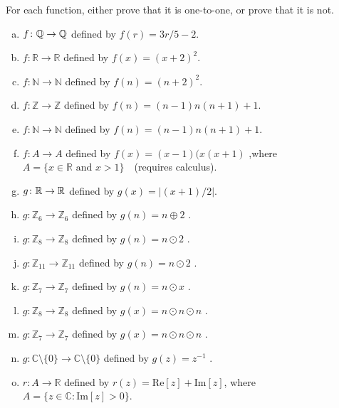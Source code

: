\begin{exercise}{40} 
For each function, either prove that it is one-to-one, or prove that it is not.
\begin{enumerate}[(a)]
\item \label{IsIt11?-linear}
 $f \colon \mathbb{Q} \to \mathbb{Q}$ defined by $f(r)=3r/5 - 2$.
\item \label{IsIt11?-square0}
 $f \colon {\mathbb R} \to {\mathbb R}$ defined by $f(x)=(x+2)^2$.
\item \label{IsIt11?-square}
 $f \colon {\mathbb N} \to {\mathbb N}$ defined by $f(n)=(n+2)^2$.
\item
 $f \colon {\mathbb Z} \to {\mathbb Z}$ defined by $f(n)=(n-1)n(n+1)+1$.
\item
 $f \colon {\mathbb N} \to {\mathbb N}$ defined by $f(n)=(n-1)n(n+1)+1$.
\item
 $f \colon A \to A$ defined by $f(x)=(x-1)(x(x+1)$ ,where \\
 $A =\{x \in \mathbb{R} \text{ and }x >1 \}$~~(requires calculus).
\item \label{IsIt11?-abs}
 $g \colon \mathbb{R} \to \mathbb{R}$ defined by $g(x)= \left|(x+1)/2 \right|$.
\item \label{modular_g}
 $g \colon {\mathbb Z}_6 \to {\mathbb Z}_6$ defined by $g(n)= n \oplus 2$ .
\item \label{modular_m}
 $g \colon {\mathbb Z}_8 \to {\mathbb Z}_8$ defined by $g(n) = n \odot 2 $ .
\item \label{modular_m2}
 $g \colon {\mathbb Z}_{11} \to {\mathbb Z}_{11}$ defined by $g(n) =  n \odot 2$ .
\item 
 $g \colon {\mathbb Z}_7 \to {\mathbb Z}_7$ defined by $g(n)= n \odot x$ .
\item 
 $g \colon {\mathbb Z}_8 \to {\mathbb Z}_8$ defined by $g(x)= n \odot n \odot n$ .
\item 
 $g \colon {\mathbb Z}_7 \to {\mathbb Z}_7$ defined by $g(x)= n \odot n \odot n$ .
\item
 $g \colon {\mathbb C}\setminus \{0\}  \to {\mathbb C}\setminus \{0\} $ defined by $g(z) =  z^{-1}$ .
\item
 $r \colon A  \to {\mathbb R} $ defined by  
$r(z) = \text{Re}[z] + \text{Im}[z]$, where \\
 $A = \{ z \in  \mathbb{C}: \text{Im}[z] > 0 \}$. 

 \end{enumerate}
\end{exercise}


